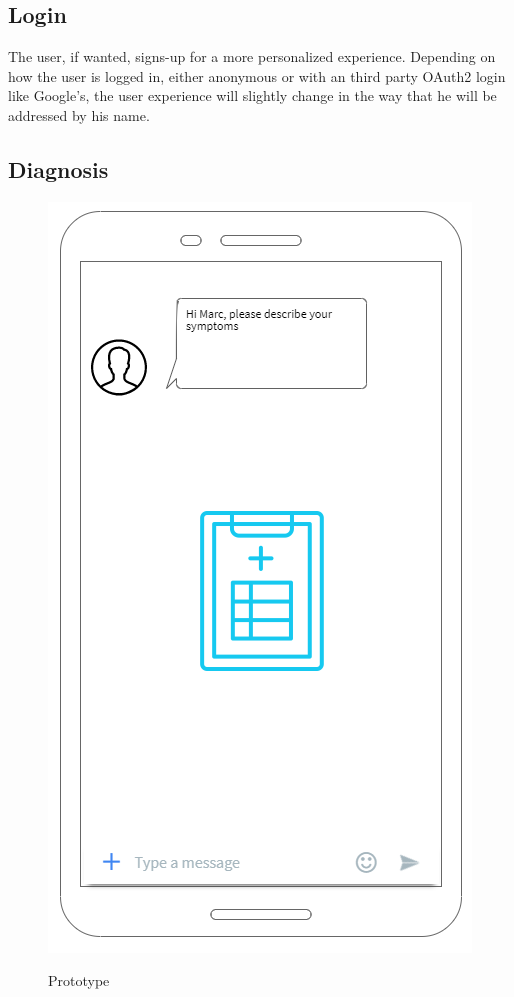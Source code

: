 \documentclass[12pt]{article}
\theoremstyle{definition}
\begin{document}
\subsection{Login}

The user, if wanted, signs-up for a more personalized experience. Depending on how the user is logged in, either anonymous or with an third party OAuth2 login like Google's, the user experience will slightly change in the way that he will be addressed by his name.

\subsection{Diagnosis}

\begin{minipage}{0.4\textwidth}
\begin{figure}[H]
\includegraphics[scale=.45]{entwurf.PNG}\\
\caption{\label{fig:blue_rectangle} Prototype}
\end{figure}
\end{minipage} \hfill
\end{document}
